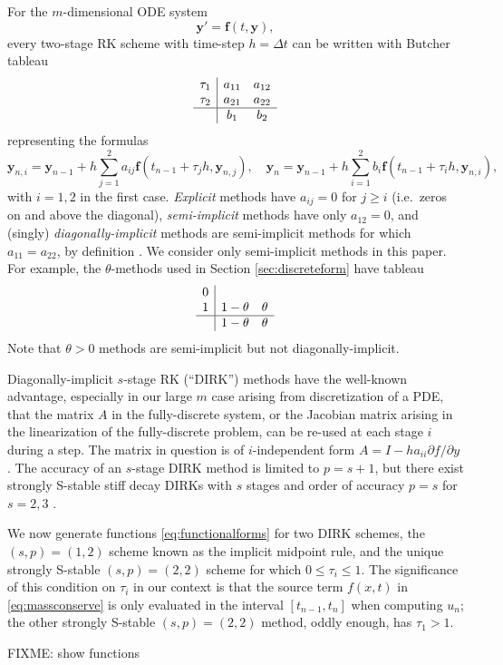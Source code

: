 \documentclass[final,leqno,onefignum,onetabnum]{siamltex1213bueler}
\newcommand\bbf{\mathbf{f}}
\newcommand\by{\mathbf{y}}
\begin{document}
For the $m$-dimensional ODE system
  $$\by' = \bbf(t,\by),$$
every two-stage RK scheme with time-step $h=\Delta t$ can be written with Butcher tableau \cite{AscherPetzold}
  $$
\begin{array}{c|cc}
\tau_1 & a_{11} & a_{12}  \\
\tau_2 & a_{21} & a_{22}  \\ \hline
       & b_1   & b_2  \\
\end{array}$$
representing the formulas
  $$\by_{n,i} = \by_{n-1} + h \sum_{j=1}^2 a_{ij} \bbf(t_{n-1} + \tau_j h, \by_{n,j}), \quad \by_n = \by_{n-1} + h \sum_{i=1}^2 b_i \bbf(t_{n-1} + \tau_i h, \by_{n,i}),$$
with $i=1,2$ in the first case.  \emph{Explicit} methods have $a_{ij}=0$ for $j\ge i$ (i.e.~zeros on and above the diagonal), \emph{semi-implicit} methods have only $a_{12}=0$, and (singly) \emph{diagonally-implicit} methods are semi-implicit methods for which $a_{11}=a_{22}$, by definition \cite{Alexander1977,AscherPetzold}.  We consider only semi-implicit methods in this paper.  For example, the $\theta$-methods used in Section \ref{sec:discreteform} have tableau
  $$
\begin{array}{c|cc}
0 &          &   \\
1 & 1-\theta & \theta  \\ \hline
  & 1-\theta & \theta  \\
\end{array}$$
Note that $\theta>0$ methods are semi-implicit but not diagonally-implicit.

Diagonally-implicit $s$-stage RK (``DIRK'') methods have the well-known advantage, especially in our large $m$ case arising from discretization of a PDE, that the matrix $A$ in the fully-discrete system, or the Jacobian matrix arising in the linearization of the fully-discrete problem, can be re-used at each stage $i$ during a step.  The matrix in question is of $i$-independent form $A = I - h a_{ii} \partial f/\partial y$ \cite{AscherPetzold}.  The accuracy of an $s$-stage DIRK method is limited to $p=s+1$, but there exist strongly S-stable stiff decay DIRKs with $s$ stages and order of accuracy $p=s$ for $s=2,3$ \cite{Alexander1977}.

We now generate functions \eqref{eq:functionalforms} for two DIRK schemes, the $(s,p)=(1,2)$ scheme known as the implicit midpoint rule, and the unique strongly S-stable $(s,p)=(2,2)$ scheme for which $0\le \tau_i\le 1$.  The significance of this condition on $\tau_i$ in our context is that the source term $f(x,t)$ in \eqref{eq:massconserve} is only evaluated in the interval $[t_{n-1},t_n]$ when computing $u_n$; the other strongly S-stable $(s,p)=(2,2)$ method, oddly enough, has $\tau_1>1$.

FIXME: show functions
\end{document}
